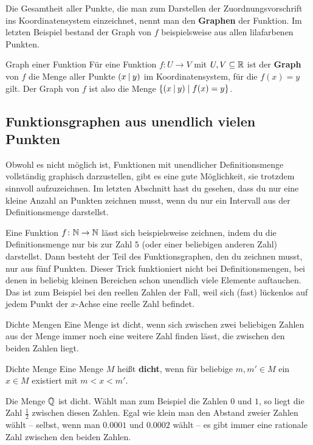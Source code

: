 \documentclass[../../main.tex]{subfiles}
\begin{document}
Die Gesamtheit aller Punkte, die man zum Darstellen der Zuordnungsvorschrift ins Koordinatensystem einzeichnet, nennt man den \textbf{Graphen} der Funktion. Im letzten Beispiel bestand der Graph von $f$ beispielsweise aus allen lilafarbenen Punkten.

\begin{definition}{Graph einer Funktion}
        Für eine Funktion $f\colon U\rightarrow V$ mit $U,V\subseteq \mathbb{R}$ ist der \textbf{Graph} von $f$ die Menge aller Punkte $\left(x \:\middle|\: y\right)$ im Koordinatensystem, für die $f(x)=y$ gilt. Der Graph von $f$ ist also die Menge $\{\left(x \:\middle|\: y\right) \mid f(x)=y\}$.
\end{definition}

\subsection{Funktionsgraphen aus unendlich vielen Punkten}
\label{sec:abbildungen_graphen_stetig}

Obwohl es nicht möglich ist, Funktionen mit unendlicher Definitionsmenge vollständig graphisch darzustellen, gibt es eine gute Möglichkeit, sie trotzdem sinnvoll aufzuzeichnen. Im letzten Abschnitt hast du gesehen, dass du nur eine kleine Anzahl an Punkten zeichnen musst, wenn du nur ein Intervall aus der Definitionsmenge darstellst.

Eine Funktion $f\colon\mathbb{N}\rightarrow\mathbb{N}$ lässt sich beispielsweise zeichnen, indem du die Definitionsmenge nur bis zur Zahl $5$ (oder einer beliebigen anderen Zahl) darstellst. Dann besteht der Teil des Funktionsgraphen, den du zeichnen musst, nur aus fünf Punkten. Dieser Trick funktioniert nicht bei Definitionsmengen, bei denen in beliebig kleinen Bereichen schon unendlich viele Elemente auftauchen. Das ist zum Beispiel bei den reellen Zahlen der Fall, weil sich (fast) lückenlos auf jedem Punkt der $x$-Achse eine reelle Zahl befindet.

\begin{advanced}{Dichte Mengen}
    Eine Menge ist dicht, wenn sich zwischen zwei beliebigen Zahlen aus der Menge immer noch eine weitere Zahl finden lässt, die zwischen den beiden Zahlen liegt.
    
    \begin{definition}{Dichte Menge}
        Eine Menge $M$ heißt \textbf{dicht}, wenn für beliebige $m,m'\in M$ ein $x\in M$ existiert mit $m<x<m'$.
    \end{definition}
    
    \begin{example}{}
        Die Menge $\mathbb{Q}$ ist dicht. Wählt man zum Beispiel die Zahlen $0$ und $1$, so liegt die Zahl $\frac{1}{2}$ zwischen diesen Zahlen. Egal wie klein man den Abstand zweier Zahlen wählt -- selbst, wenn man $0.0001$ und $0.0002$ wählt -- es gibt immer eine rationale Zahl zwischen den beiden Zahlen.
    \end{example}
\end{advanced}
\fi
\end{document}
